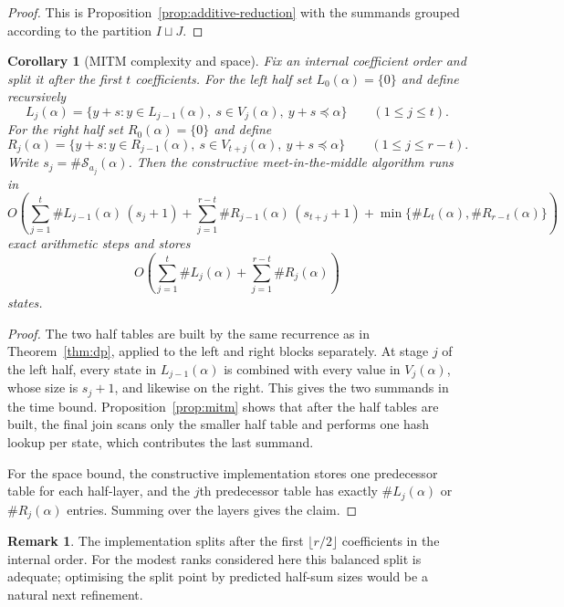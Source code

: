 \documentclass[manuscript]{acmart}
\theoremstyle{plain}
\newtheorem{corollary}[theorem]{Corollary}
\theoremstyle{definition}
\theoremstyle{nonitalicremark}
\newtheorem{remark}[theorem]{Remark}
\newcommand{\cS}{\mathcal{S}}
\begin{document}
\begin{proof}
This is Proposition~\ref{prop:additive-reduction} with the summands grouped according to the
partition $I\sqcup J$.
\end{proof}


\begin{corollary}[MITM complexity and space]\label{cor:mitm-complexity}
Fix an internal coefficient order and split it after the first $t$ coefficients. For the left half
set $L_0(\alpha)=\{0\}$ and define recursively
\[
L_j(\alpha)=\{y+s : y\in L_{j-1}(\alpha),\ s\in V_j(\alpha),\ y+s\preccurlyeq \alpha\}
\qquad (1\le j\le t).
\]
For the right half set $R_0(\alpha)=\{0\}$ and define
\[
R_j(\alpha)=\{y+s : y\in R_{j-1}(\alpha),\ s\in V_{t+j}(\alpha),\ y+s\preccurlyeq \alpha\}
\qquad (1\le j\le r-t).
\]
Write $s_j=\#\cS_{a_j}(\alpha)$. Then the constructive meet-in-the-middle algorithm runs in
\[
O\!\left(
\sum_{j=1}^{t}\#L_{j-1}(\alpha)\,(s_j+1)
+
\sum_{j=1}^{r-t}\#R_{j-1}(\alpha)\,(s_{t+j}+1)
+
\min\{\#L_t(\alpha),\#R_{r-t}(\alpha)\}
\right)
\]
exact arithmetic steps and stores
\[
O\!\left(
\sum_{j=1}^{t}\#L_j(\alpha)
+
\sum_{j=1}^{r-t}\#R_j(\alpha)
\right)
\]
states.
\end{corollary}

\begin{proof}
The two half tables are built by the same recurrence as in Theorem~\ref{thm:dp}, applied to the left
and right blocks separately. At stage $j$ of the left half, every state in $L_{j-1}(\alpha)$ is
combined with every value in $V_j(\alpha)$, whose size is $s_j+1$, and likewise on the right. This
gives the two summands in the time bound. Proposition~\ref{prop:mitm} shows that after the half
tables are built, the final join scans only the smaller half table and performs one hash lookup per
state, which contributes the last summand.

For the space bound, the constructive implementation stores one predecessor table for each half-layer,
and the $j$th predecessor table has exactly $\#L_j(\alpha)$ or $\#R_j(\alpha)$ entries. Summing over
the layers gives the claim.
\end{proof}

\begin{remark}
The implementation splits after the first $\lfloor r/2\rfloor$ coefficients in the internal order.
For the modest ranks considered here this balanced split is adequate; optimising the split point by
predicted half-sum sizes would be a natural next refinement.
\end{remark}
\end{document}
